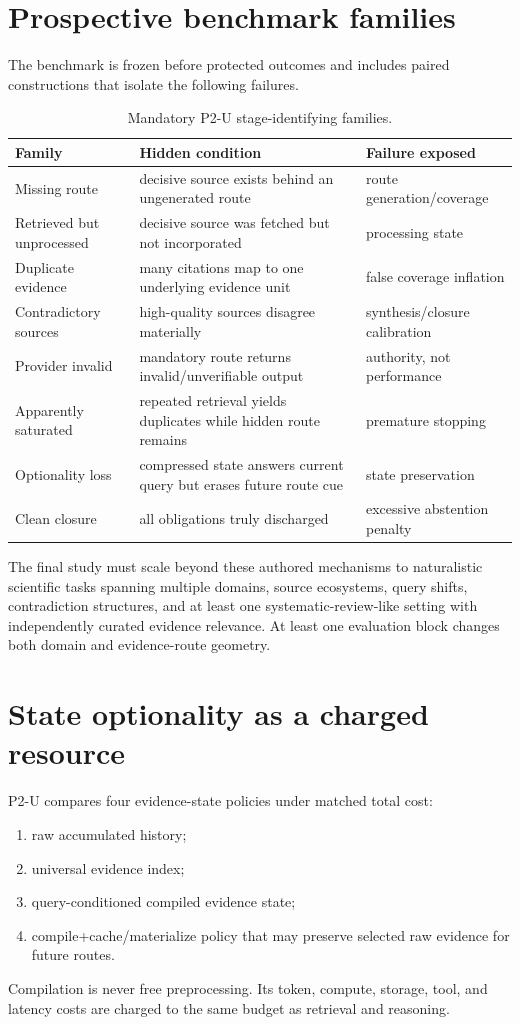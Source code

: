 \documentclass[11pt]{article}
\begin{document}
\section{Prospective benchmark families}
The benchmark is frozen before protected outcomes and includes paired constructions that isolate the following failures.

\begin{table}[h]
\centering
\small
\begin{tabularx}{\textwidth}{@{}lXX@{}}
\toprule
Family & Hidden condition & Failure exposed \\
\midrule
Missing route & decisive source exists behind an ungenerated route & route generation/coverage \\
Retrieved but unprocessed & decisive source was fetched but not incorporated & processing state \\
Duplicate evidence & many citations map to one underlying evidence unit & false coverage inflation \\
Contradictory sources & high-quality sources disagree materially & synthesis/closure calibration \\
Provider invalid & mandatory route returns invalid/unverifiable output & authority, not performance \\
Apparently saturated & repeated retrieval yields duplicates while hidden route remains & premature stopping \\
Optionality loss & compressed state answers current query but erases future route cue & state preservation \\
Clean closure & all obligations truly discharged & excessive abstention penalty \\
\bottomrule
\end{tabularx}
\caption{Mandatory P2-U stage-identifying families.}
\end{table}

The final study must scale beyond these authored mechanisms to naturalistic scientific tasks spanning multiple domains, source ecosystems, query shifts, contradiction structures, and at least one systematic-review-like setting with independently curated evidence relevance. At least one evaluation block changes both domain and evidence-route geometry.

\section{State optionality as a charged resource}
P2-U compares four evidence-state policies under matched total cost:
\begin{enumerate}
    \item raw accumulated history;
    \item universal evidence index;
    \item query-conditioned compiled evidence state;
    \item compile+cache/materialize policy that may preserve selected raw evidence for future routes.
\end{enumerate}
Compilation is never free preprocessing. Its token, compute, storage, tool, and latency costs are charged to the same budget as retrieval and reasoning.
\end{document}
